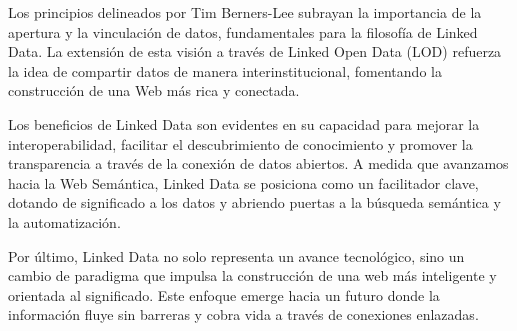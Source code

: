 \documentclass[11pt]{report}
\begin{document}
Los principios delineados por Tim Berners-Lee subrayan la importancia de la apertura y la vinculación de datos, fundamentales para la filosofía de Linked Data. La extensión de esta visión a través de Linked Open Data (LOD) refuerza la idea de compartir datos de manera interinstitucional, fomentando la construcción de una Web más rica y conectada.

Los beneficios de Linked Data son evidentes en su capacidad para mejorar la interoperabilidad, facilitar el descubrimiento de conocimiento y promover la transparencia a través de la conexión de datos abiertos. A medida que avanzamos hacia la Web Semántica, Linked Data se posiciona como un facilitador clave, dotando de significado a los datos y abriendo puertas a la búsqueda semántica y la automatización.

Por último, Linked Data no solo representa un avance tecnológico, sino un cambio de paradigma que impulsa la construcción de una web más inteligente y orientada al significado. Este enfoque emerge hacia un futuro donde la información fluye sin barreras y cobra vida a través de conexiones enlazadas.
\end{document}
